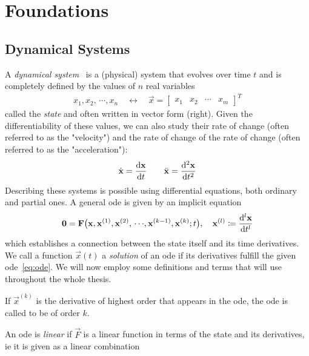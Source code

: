 \chapter{Foundations}
	\label{c:foundations}
	
	\section{Dynamical Systems}
		A \emph{dynamical system}~\cite{birkhoffDynamicalSystems1927} is a (physical) system that evolves over time \(t\) and is completely defined by the values of \(n\) real variables
		\begin{align*}
			x_1, x_2, \,\cdots\!, x_n \quad\longleftrightarrow\quad \vec{x} = \begin{bmatrix} x_1 & x_2 & \cdots & x_m \end{bmatrix}^T
		\end{align*}
		called the \emph{state} and often written in vector form (right). Given the differentiability of these values, we can also study their rate of change (often referred to as the "velocity") and the rate of change of the rate of change (often referred to as the "acceleration"):
		\begin{align*}
			\dot{\boldsymbol{\mathrm{x}}} = \dv{\boldsymbol{\mathrm{x}}}{t} \qquad \ddot{\boldsymbol{\mathrm{x}}} = \dv[2]{\boldsymbol{\mathrm{x}}}{t}
		\end{align*}
		Describing these systems is possible using differential equations, both ordinary and partial ones. A general \ac{ode} is given by an implicit equation
		\begin{align}
			\boldsymbol{\mathrm{0}} = \boldsymbol{\mathrm{F}}\big( \boldsymbol{\mathrm{x}}, \boldsymbol{\mathrm{x}}^{(1)}, \boldsymbol{\mathrm{x}}^{(2)}, \,\cdots\!, \boldsymbol{\mathrm{x}}^{(k - 1)}, \boldsymbol{\mathrm{x}}^{(k)}; t \big),\quad \boldsymbol{\mathrm{x}}^{(l)} \coloneqq \dv[l]{\boldsymbol{\mathrm{x}}}{t}  \label{eq:ode}
		\end{align}
		which establishes a connection between the state itself and its time derivatives. We call a function \( \vec{x}(t) \) a \emph{solution} of an \ac{ode} if its derivatives fulfill the given \ac{ode}~\eqref{eq:ode}. We will now employ some definitions and terms that will use throughout the whole thesis.
		\begin{description}[leftmargin = 3cm]
			\item[Order] If \( \vec{x}^{(k)} \) is the derivative of highest order that appears in the \ac{ode}, the \ac{ode} is called to be of order \(k\).
			\item[Linearity] An \ac{ode} is \emph{linear} if \(\vec{F}\) is a linear function in terms of the state and its derivatives, \ac{ie} it is given as a linear combination
		\end{description}
